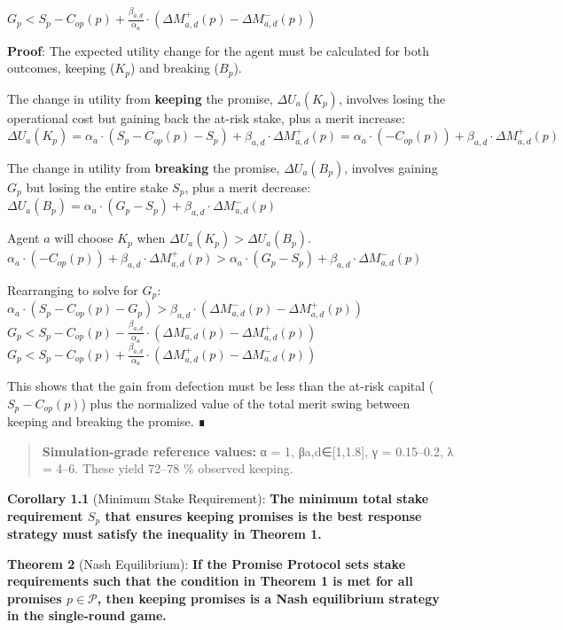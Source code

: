 \documentclass[11pt]{article}
\begin{document}
\(G_p < S_p - C_{op}(p) + \frac{\beta_{a,d}}{\alpha_a} \cdot (\Delta M_{a,d}^+(p) - \Delta M_{a,d}^-(p))\)

\textbf{Proof}:
The expected utility change for the agent must be calculated for both outcomes, keeping (\(K_p\)) and breaking (\(B_p\)).

The change in utility from \textbf{keeping} the promise, \(\Delta U_a(K_p)\), involves losing the operational cost but gaining back the at-risk stake, plus a merit increase:
\(\Delta U_a(K_p) = \alpha_a \cdot (S_p - C_{op}(p) - S_p) + \beta_{a,d} \cdot \Delta M_{a,d}^+(p) = \alpha_a \cdot (-C_{op}(p)) + \beta_{a,d} \cdot \Delta M_{a,d}^+(p)\)

The change in utility from \textbf{breaking} the promise, \(\Delta U_a(B_p)\), involves gaining \(G_p\) but losing the entire stake \(S_p\), plus a merit decrease:
\(\Delta U_a(B_p) = \alpha_a \cdot (G_p - S_p) + \beta_{a,d} \cdot \Delta M_{a,d}^-(p)\)

Agent \(a\) will choose \(K_p\) when \(\Delta U_a(K_p) > \Delta U_a(B_p)\).
\(\alpha_a \cdot (-C_{op}(p)) + \beta_{a,d} \cdot \Delta M_{a,d}^+(p) > \alpha_a \cdot (G_p - S_p) + \beta_{a,d} \cdot \Delta M_{a,d}^-(p)\)

Rearranging to solve for \(G_p\):
\(\alpha_a \cdot (S_p - C_{op}(p) - G_p) > \beta_{a,d} \cdot (\Delta M_{a,d}^-(p) - \Delta M_{a,d}^+(p))\)
\(G_p < S_p - C_{op}(p) - \frac{\beta_{a,d}}{\alpha_a} \cdot (\Delta M_{a,d}^-(p) - \Delta M_{a,d}^+(p))\)
\(G_p < S_p - C_{op}(p) + \frac{\beta_{a,d}}{\alpha_a} \cdot (\Delta M_{a,d}^+(p) - \Delta M_{a,d}^-(p))\)

This shows that the gain from defection must be less than the at-risk capital (\(S_p - C_{op}(p)\)) plus the normalized value of the total merit swing between keeping and breaking the promise. ∎

\begin{quote}
\textbf{Simulation-grade reference values:}
α = 1, βa,d∈[1,1.8], γ = 0.15–0.2, λ = 4–6. These yield 72–78 \% observed keeping.
\end{quote}

\textbf{Corollary 1.1} (Minimum Stake Requirement): \textbf{The minimum total stake requirement \(S_p\) that ensures keeping promises is the best response strategy must satisfy the inequality in Theorem 1.}

\textbf{Theorem 2} (Nash Equilibrium): \textbf{If the Promise Protocol sets stake requirements such that the condition in Theorem 1 is met for all promises \(p \in \mathcal{P}\), then keeping promises is a Nash equilibrium strategy in the single-round game.}
\end{document}
